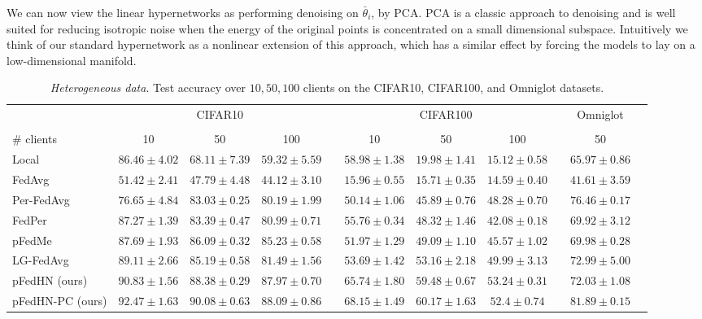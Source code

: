 \documentclass{article}
\newcommand\ourmethod{pFedHN}
\begin{document}
We can now view the linear hypernetworks as performing denoising on $\bar{\theta}_i$, by PCA. PCA is a classic approach to denoising \cite{PCAdenoising} and is well suited for reducing isotropic noise when the energy of the original points is concentrated on a small dimensional subspace. Intuitively we think of our standard hypernetwork as a nonlinear extension of this approach, which has a similar effect by forcing the models to lay on a low-dimensional manifold.

\setlength{\tabcolsep}{5pt}
\begin{table*}[t]
\scriptsize
    \centering
    \caption{\textit{Heterogeneous data}. Test accuracy over $10, 50, 100$ clients on the CIFAR10, CIFAR100, and Omniglot datasets.}
    \vskip 0.11in
    \begin{tabular}{l c c c c c c c c c c}
    \toprule
    & \multicolumn{3}{c}{CIFAR10} & & \multicolumn{3}{c}{CIFAR100} && Omniglot\\
     \cmidrule{2-4}\cmidrule{6-8}\cmidrule{10-10}\\
     \# clients & 10 & 50 & 100  & &  10 & 50 & 100 && 50\\
    \midrule
    Local & $86.46 \pm 4.02$ & $68.11 \pm 7.39$ & $59.32 \pm 5.59$ && $58.98 \pm 1.38$ & $19.98 \pm 1.41$ & $15.12 \pm 0.58$ && $65.97 \pm 0.86$ \\
    FedAvg & $51.42 \pm 2.41$ & $47.79 \pm 4.48$ & $44.12 \pm 3.10$ && $15.96 \pm 0.55$ & $15.71 \pm 0.35$ & $14.59 \pm 0.40$ && $41.61 \pm 3.59$ \\
        \hline
    Per-FedAvg & $76.65 \pm 4.84$ & $83.03 \pm 0.25$ & $80.19 \pm 1.99$ && $50.14 \pm 1.06$ & $45.89 \pm 0.76$ & $48.28 \pm 0.70$ && $76.46 \pm 0.17$\\
    FedPer & $87.27 \pm 1.39$ &  $83.39 \pm 0.47$ & $80.99 \pm 0.71$ && $55.76 \pm 0.34$ & $48.32 \pm 1.46$ & $42.08 \pm 0.18$ &&  $69.92 \pm 3.12$\\
    pFedMe & $87.69 \pm 1.93$ &  $86.09 \pm 0.32$ & $85.23 \pm 0.58$ && $51.97 \pm 1.29$ & $49.09 \pm 1.10$ & $45.57 \pm 1.02$ &&  $ 69.98 \pm 0.28$\\
    LG-FedAvg & $89.11 \pm 2.66$ & $85.19 \pm 0.58$ & $81.49 \pm 1.56$ && $53.69 \pm 1.42$ & $53.16 \pm 2.18$ & $49.99 \pm 3.13$ && $72.99 \pm 5.00$\\
    \midrule
    \ourmethod{} (ours) & $90.83\pm 1.56$ & $88.38 \pm 0.29$ & $87.97 \pm 0.70$ &&  $65.74\pm 1.80$ & $59.48 \pm 0.67$ & $\mathbf{53.24 \pm 0.31}$ &&  
    $72.03 \pm 1.08$ \\
    \ourmethod{}-PC (ours) & $\mathbf{92.47 \pm 1.63}$ & $\mathbf{90.08 \pm 0.63}$ & $\mathbf{88.09 \pm 0.86}$ && $\mathbf{68.15 \pm 1.49} $ & $\mathbf{60.17 \pm 1.63}$ & $52.4 \pm 0.74$ &&  
    $\mathbf{81.89 \pm 0.15}$ \\
    \bottomrule
    \end{tabular}
    \label{tab:hetro}
\end{table*}
\end{document}
